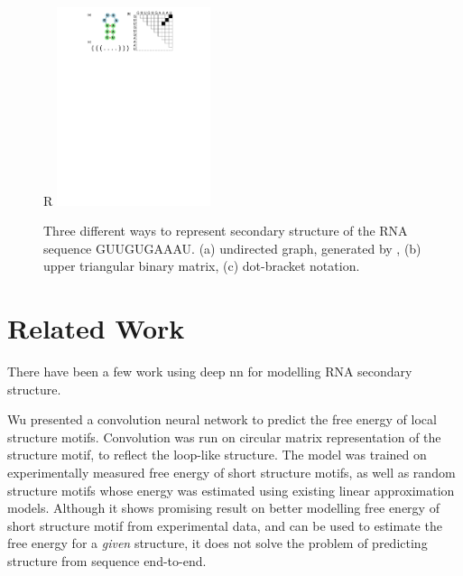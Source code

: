 \documentclass{article}
\begin{document}
\begin{figure}{R}
        \centering
        \includegraphics[width=0.4\textwidth]{plot/rna_ss_binary_mat.pdf}
        \caption{Three different ways to represent secondary structure of the RNA sequence GUUGUGAAAU. (a) undirected graph, generated by \cite{kerpedjiev2015forna}, (b) upper triangular binary matrix, (c) dot-bracket notation.}
        \label{fig:rna_ss_binary_mat}
        \centering
\end{figure}





\section{Related Work}

There have been a few work using deep nn for modelling RNA secondary structure.

Wu\cite{wu2018convolutional} presented a convolution neural network to predict the free energy of local structure motifs.
Convolution was run on circular matrix representation of the structure motif, to reflect the loop-like structure.
The model was trained on experimentally measured free energy of short structure motifs,
as well as random structure motifs whose energy was estimated using existing linear approximation models.
Although it shows promising result on better modelling free energy of short structure motif from experimental data,
and can be used to estimate the free energy for a \textit{given} structure,
it does not solve the problem of predicting structure from sequence end-to-end.
\end{document}
